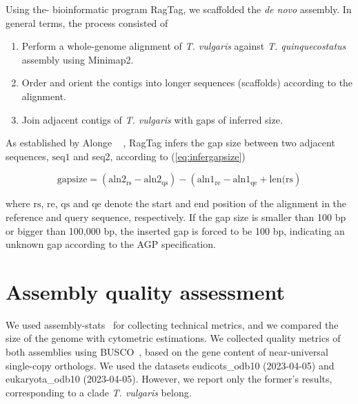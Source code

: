 Using the- bioinformatic program RagTag\cite{alongeAutomatedAssemblyScaffolding2022}, we scaffolded the \textit{de novo} assembly. In general terms, the process consisted of 
\begin{enumerate}
    \item Perform a whole-genome alignment of \textit{T. vulgaris} against \textit{T. quinquecostatus} assembly using Minimap2. 
    \item Order and orient the contigs into longer sequences (scaffolds) according to the alignment. 
    \item Join adjacent contigs of \textit{T. vulgaris} with gaps of inferred size. 
\end{enumerate}

As established by Alonge \etal ~ \cite{alongeAutomatedAssemblyScaffolding2022}, RagTag infers the gap size between two adjacent sequences, $\textrm{seq1}$ and \textrm{seq2}, according to (\ref{eq:infergapsize})

\begin{equation}\label{eq:infergapsize}
\textrm{gapsize}  = \left(\textrm{aln2}_\textrm{rs} - \textrm{aln2}_\textrm{qs}\right) - \left(\textrm{aln1}_\textrm{re} - \textrm{aln1}_\textrm{qe} + \textrm{len}(\textrm{rs}\right)
\end{equation}

where $\textrm{rs}$, $\textrm{re}$, $\textrm{qs}$ and $\textrm{qe}$ denote the start and end position of the alignment in the reference and query sequence, respectively. If the gap size is smaller than 100 bp or bigger than 100,000 bp, the inserted gap is forced to be 100 bp, indicating an unknown gap according to the AGP specification.\cite{AGPSpecificationV2} 

\section*{Assembly quality assessment}

We used assembly-stats~\cite{Assemblystats2023} for collecting technical metrics, and we compared the size of the genome with cytometric estimations\cite{PlantDNACvalues}. We collected quality metrics of both assemblies using BUSCO~\cite{manniBUSCOAssessingGenomic2021}, based on the gene content of near-universal single-copy orthologs. We used the datasets eudicots\_odb10 (2023-04-05) and eukaryota\_odb10 (2023-04-05). However, we report only the former's results, corresponding to a clade \textit{T. vulgaris} belong. \\



